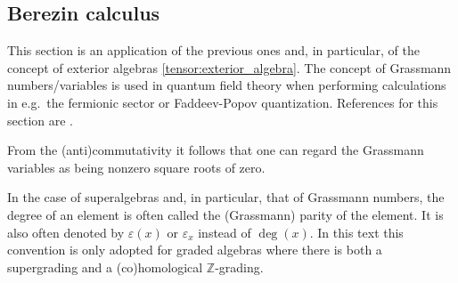 
\subsection{Berezin calculus}\label{section:berezin}

    This section is an application of the previous ones and, in particular, of the concept of exterior algebras \ref{tensor:exterior_algebra}. The concept of Grassmann numbers/variables is used in quantum field theory when performing calculations in e.g.\ the fermionic sector or Faddeev-Popov quantization. References for this section are \cite{losev_berezin, AMP2}.

    \begin{remark}
        From the (anti)commutativity it follows that one can regard the Grassmann variables as being nonzero square roots of zero.
    \end{remark}

    \begin{notation}[Parity]
        In the case of superalgebras and, in particular, that of Grassmann numbers, the degree of an element is often called the (Grassmann) parity of the element. It is also often denoted by $\varepsilon(x)$ or $\varepsilon_x$ instead of $\deg(x)$. In this text this convention is only adopted for graded algebras where there is both a supergrading and a (co)homological $\mathbb{Z}$-grading.
    \end{notation}


